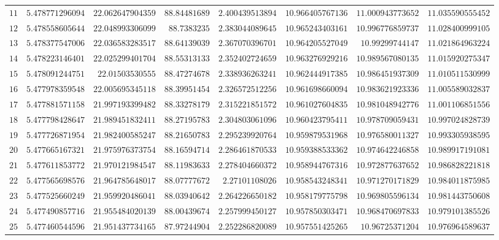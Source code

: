 {\begin{longtable}{@{}rrrrrrrr@{}}
$11$ & $5.478771296094$ & $22.062647904359$ & $88.84481689$ & $2.400439513894$ & $10.966405767136$ & $11.000943773652$ & $11.035590555452$\\
$12$ & $5.478558605644$ & $22.048993306099$ & $88.7383235$ & $2.383044089645$ & $10.965243403161$ & $10.996776859737$ & $11.028400999105$\\
$13$ & $5.478377547006$ & $22.036583283517$ & $88.64139039$ & $2.367070396701$ & $10.964205527049$ & $10.99299744147$ & $11.021864963224$\\
$14$ & $5.478223146401$ & $22.025299401704$ & $88.55313133$ & $2.352402724659$ & $10.963276929216$ & $10.989567080135$ & $11.015920275347$\\
$15$ & $5.478091244751$ & $22.01503530555$ & $88.47274678$ & $2.338936263241$ & $10.962444917385$ & $10.986451937309$ & $11.010511530999$\\
$16$ & $5.477978359548$ & $22.005695345118$ & $88.39951454$ & $2.326572512256$ & $10.961698660094$ & $10.983621923336$ & $11.005589032837$\\
$17$ & $5.477881571158$ & $21.997193399482$ & $88.33278179$ & $2.315221851572$ & $10.961027604835$ & $10.981048942776$ & $11.001106851556$\\
$18$ & $5.477798428647$ & $21.989451832411$ & $88.27195783$ & $2.304803061096$ & $10.960423795411$ & $10.978709059431$ & $10.997024828739$\\
$19$ & $5.477726871954$ & $21.982400585247$ & $88.21650783$ & $2.295239920764$ & $10.959879531968$ & $10.976580011327$ & $10.993305938595$\\
$20$ & $5.477665167321$ & $21.975976373754$ & $88.16594714$ & $2.286461870533$ & $10.959388533362$ & $10.974642246858$ & $10.989917191081$\\
$21$ & $5.477611853772$ & $21.970121984547$ & $88.11983633$ & $2.278404660372$ & $10.958944767316$ & $10.972877637652$ & $10.986828221818$\\
$22$ & $5.477565698576$ & $21.964785648017$ & $88.07777672$ & $2.27101108026$ & $10.958543248341$ & $10.971270171829$ & $10.984011875985$\\
$23$ & $5.477525660249$ & $21.959920486041$ & $88.03940642$ & $2.264226650182$ & $10.958179775798$ & $10.969805596134$ & $10.981443750608$\\
$24$ & $5.477490857716$ & $21.955484020139$ & $88.00439674$ & $2.257999450127$ & $10.957850303471$ & $10.968470697833$ & $10.979101385526$\\
$25$ & $5.477460544596$ & $21.951437734165$ & $87.97244904$ & $2.252286820089$ & $10.957551425265$ & $10.96725371204$ & $10.976964589637$\\

\end{longtable}}
